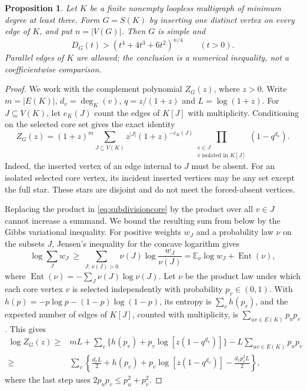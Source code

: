 \documentclass[11pt]{article}
\newtheorem{proposition}[theorem]{Proposition}
\newcommand{\E}{\mathbb E}\newcommand{\Prob}{\mathbb P}
\begin{document}
\begin{proposition}\label{prop:subdivision}
Let $K$ be a finite nonempty loopless multigraph of minimum degree at least
three. Form $G=S(K)$ by inserting one distinct vertex on every edge of $K$,
and put $n=|V(G)|$. Then $G$ is simple and
\[
 D_G(t)>(t^4+4t^3+6t^2)^{n/4}\qquad(t>0).
\]
Parallel edges of $K$ are allowed; the conclusion is a numerical inequality,
not a coefficientwise comparison.
\end{proposition}
\begin{proof}
We work with the complement polynomial $Z_G(z)$, where $z>0$. Write
$m=|E(K)|$, $d_v=\deg_K(v)$, $q=z/(1+z)$ and $L=\log(1+z)$.
For $J\subseteq V(K)$, let $e_K(J)$ count the edges of $K[J]$ with
multiplicity. Conditioning on the selected core set gives the exact identity
\begin{equation}\label{eq:subdivisioncore}
 Z_G(z)=(1+z)^m\sum_{J\subseteq V(K)}
 z^{|J|}(1+z)^{-e_K(J)}
 \prod_{\substack{v\in J\\v\text{ isolated in }K[J]}}(1-q^{d_v}).
\end{equation}
Indeed, the inserted vertex of an edge internal to $J$ must be absent. For
an isolated selected core vertex, its incident inserted vertices may be any
set except the full star. These stars are disjoint and do not meet the
forced-absent vertices.

Replacing the product in \eqref{eq:subdivisioncore} by the product over all
$v\in J$ cannot increase a summand. We bound the resulting sum from below by the Gibbs variational inequality. For positive weights $w_J$ and a probability law $\nu$ on the subsets $J$, Jensen's inequality for the concave logarithm gives
\[
 \log\sum_J w_J\ \ge\ \sum_{J:\,\nu(J)>0}\nu(J)\log\frac{w_J}{\nu(J)}
 =\E_\nu\log w_J+\operatorname{Ent}(\nu),
\]
where $\operatorname{Ent}(\nu)=-\sum_J\nu(J)\log\nu(J)$. Let $\nu$ be the product law under which each core vertex $v$ is selected independently with probability $p_v\in(0,1)$. With
$h(p)=-p\log p-(1-p)\log(1-p)$, its entropy is $\sum_vh(p_v)$, and the expected number of edges of $K[J]$, counted with multiplicity, is $\sum_{uv\in E(K)}p_up_v$. This gives
\begin{align*}
 \log Z_G(z)\ge{}&mL+\sum_v\{h(p_v)+p_v\log[z(1-q^{d_v})]\}
                  -L\sum_{uv\in E(K)}p_up_v\\
 \ge{}&\sum_v\left\{\frac{d_vL}{2}+h(p_v)
       +p_v\log[z(1-q^{d_v})]-\frac{d_vp_v^2L}{2}\right\},
\end{align*}
where the last step uses $2p_up_v\le p_u^2+p_v^2$.


\end{proof}
\end{document}
